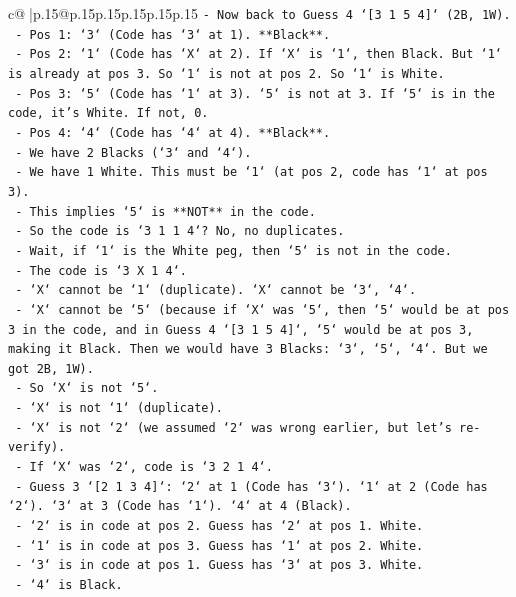 \documentclass{article}
\begin{document}
{\begin{supertabular}{c@{$\;$}|p{.15\linewidth}@{}p{.15\linewidth}p{.15\linewidth}p{.15\linewidth}p{.15\linewidth}p{.15\linewidth}}
{{{\texttt{{-} Now back to Guess 4 `{[}3 1 5 4{]}` (2B, 1W).} \\
\texttt{  {-} Pos 1: `3` (Code has `3` at 1). **Black**.} \\
\texttt{  {-} Pos 2: `1` (Code has `X` at 2). If `X` is `1`, then Black. But `1` is already at pos 3. So `1` is not at pos 2. So `1` is White.} \\
\texttt{  {-} Pos 3: `5` (Code has `1` at 3). `5` is not at 3. If `5` is in the code, it's White. If not, 0.} \\
\texttt{  {-} Pos 4: `4` (Code has `4` at 4). **Black**.} \\
\texttt{  {-} We have 2 Blacks (`3` and `4`).} \\
\texttt{  {-} We have 1 White. This must be `1` (at pos 2, code has `1` at pos 3).} \\
\texttt{  {-} This implies `5` is **NOT** in the code.} \\
\texttt{  {-} So the code is `3 1 1 4`? No, no duplicates.} \\
\texttt{  {-} Wait, if `1` is the White peg, then `5` is not in the code.} \\
\texttt{  {-} The code is `3 X 1 4`.} \\
\texttt{  {-} `X` cannot be `1` (duplicate). `X` cannot be `3`, `4`.} \\
\texttt{  {-} `X` cannot be `5` (because if `X` was `5`, then `5` would be at pos 3 in the code, and in Guess 4 `{[}3 1 5 4{]}`, `5` would be at pos 3, making it Black. Then we would have 3 Blacks: `3`, `5`, `4`. But we got 2B, 1W).} \\
\texttt{  {-} So `X` is not `5`.} \\
\texttt{  {-} `X` is not `1` (duplicate).} \\
\texttt{  {-} `X` is not `2` (we assumed `2` was wrong earlier, but let's re{-}verify).} \\
\texttt{    {-} If `X` was `2`, code is `3 2 1 4`.} \\
\texttt{    {-} Guess 3 `{[}2 1 3 4{]}`: `2` at 1 (Code has `3`). `1` at 2 (Code has `2`). `3` at 3 (Code has `1`). `4` at 4 (Black).} \\
\texttt{      {-} `2` is in code at pos 2. Guess has `2` at pos 1. White.} \\
\texttt{      {-} `1` is in code at pos 3. Guess has `1` at pos 2. White.} \\
\texttt{      {-} `3` is in code at pos 1. Guess has `3` at pos 3. White.} \\
\texttt{      {-} `4` is Black.} \\
}}}
\end{supertabular}}
\end{document}
